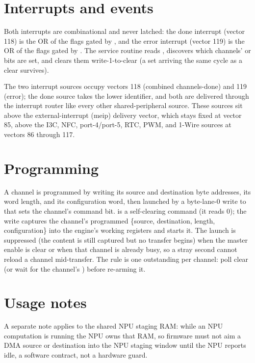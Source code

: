 \section{Interrupts and events}

Both interrupts are combinational and never latched: the done interrupt (vector 118) is the OR of the  flags gated by , and the error interrupt (vector 119) is the OR of the  flags gated by . The service routine reads , discovers which channels'  or  bits are set, and clears them write-1-to-clear (a set arriving the same cycle as a clear survives).

The two interrupt sources occupy vectors 118 (combined channels-done) and 119 (error); the done source takes the lower identifier, and both are delivered through the interrupt router like every other shared-peripheral source. These sources sit above the external-interrupt (meip) delivery vector, which stays fixed at vector 85, above the I3C, NFC,  port-4/port-5, RTC, PWM, and 1-Wire sources at vectors 86 through 117.

\section{Programming}

A channel is programmed by writing its source and destination byte addresses, its word length, and its configuration word, then launched by a byte-lane-0 write to  that sets the channel's  command bit.  is a self-clearing command (it reads 0); the write captures the channel's programmed \{source, destination, length, configuration\} into the engine's working registers and starts it. The launch is suppressed (the content is still captured but no transfer begins) when the master enable  is clear or when that channel is already busy, so a stray second  cannot reload a channel mid-transfer. The rule is one outstanding  per channel: poll  clear (or wait for the channel's ) before re-arming it.

\section{Usage notes}

A separate note applies to the shared NPU staging RAM: while an NPU computation is running the NPU owns that RAM, so firmware must not aim a DMA source or destination into the NPU staging window until the NPU reports idle, a software contract, not a hardware guard.

